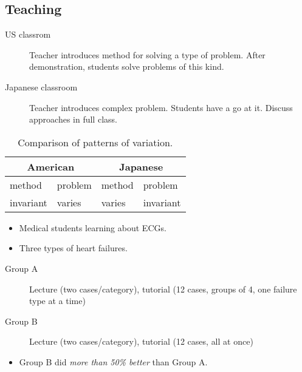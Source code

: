 \subsection{Teaching}

\begin{frame}
  \begin{example}
    \begin{description}
      \item[US classrom] Teacher introduces method for solving a type of 
        problem.
        After demonstration, students solve problems of this kind.

      \item[Japanese classroom] Teacher introduces complex problem.
        Students have a go at it.
        Discuss approaches in full class.
    \end{description}
  \end{example}

  \begin{table}
    \caption{Comparison of patterns of variation.}
    \begin{tabular}{llll}
      \toprule
      \multicolumn{2}{c}{American} &
      \multicolumn{2}{c}{Japanese} \\
      \midrule
      method & \alert{problem} & \alert{method} & {problem} \\
      invariant & \alert{varies} & \alert{varies} & {invariant} \\
      \bottomrule
    \end{tabular}
  \end{table}
\end{frame}

\begin{frame}
  \begin{example}
    \begin{itemize}
      \item Medical students learning about ECGs.
      \item Three types of heart failures.
    \end{itemize}
    \begin{description}
      \item[Group A] Lecture (two cases/category), tutorial (12 cases,
        \alert<2->{groups of 4, one failure type at a time})
      \item[Group B] Lecture (two cases/category), tutorial (12 cases,
        \alert<2->{all at once})
    \end{description}
    \begin{itemize}
      \item<3> Group B did \emph{more than 50\% better} than Group A.
    \end{itemize}
  \end{example}
\end{frame}


